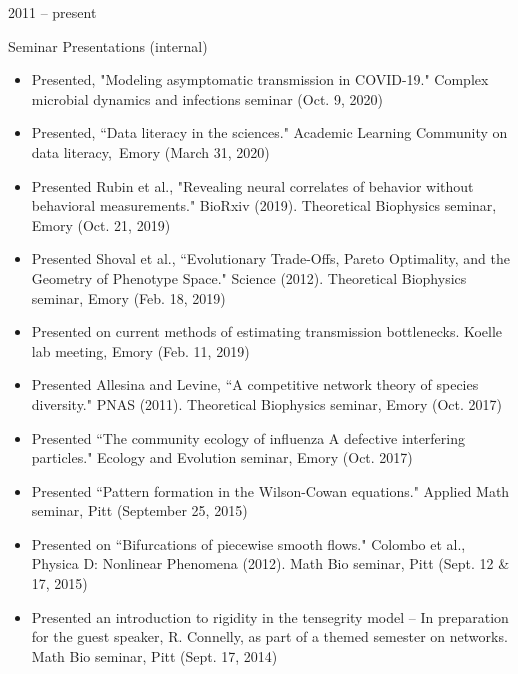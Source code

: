 \documentclass[a4paper,10pt]{article}
\newlength{\cvcolumngapwidth}
\newlength{\cvleftcolumnwidth}
\newlength{\cvrightcolumnwidth}
\newcommand{\cvtitlestyle}[1]{{\large\cvtitlefont\textcolor{cvtitlecolor}{#1}}}
\newcommand{\cvdurationstyle}[1]{{\small\cvdurationfont\textcolor{cvdurationcolor}{#1}}}
\newlength{\cvafteritemskipamount}
\newlength{\cvaftertitleskipamount}
\newlength{\cvparskip}
\newcommand{\cvitem}[2]{
    \begin{minipage}[t]{\cvleftcolumnwidth}
        \raggedleft #1
    \end{minipage}%
    \hspace{\cvcolumngapwidth}%
    \begin{minipage}[t]{\cvrightcolumnwidth}
        \setlength{\parskip}{\cvparskip} #2
    \end{minipage}

    \vspace{\cvafteritemskipamount}
}
\newcommand{\cvtitle}[1]{
    \cvtitlestyle{#1}

    \vspace{\cvaftertitleskipamount}
    \vspace{-\cvparskip}
}
\begin{document}
\cvitem{
    \cvdurationstyle{2011 -- present}
}{
    \cvtitle{Seminar Presentations (internal)}
    \begin{itemize}[leftmargin=*]
	\item Presented, "Modeling asymptomatic transmission in COVID-19." Complex microbial dynamics and infections seminar (Oct. 9, 2020) \\
    	\item Presented, ``Data literacy in the sciences."  Academic Learning Community on data literacy,\, Emory (March 31, 2020)\\
    	\item Presented Rubin et al., "Revealing neural correlates of behavior without behavioral measurements." BioRxiv (2019). Theoretical Biophysics seminar, Emory (Oct. 21, 2019) \\
        \item Presented Shoval et al., ``Evolutionary Trade-Offs, Pareto Optimality, and the Geometry of Phenotype Space." Science (2012). Theoretical Biophysics seminar, Emory (Feb. 18, 2019) \\
        \item Presented on current methods of estimating transmission bottlenecks. Koelle lab meeting, Emory (Feb. 11, 2019) \\
        \item Presented Allesina and Levine, ``A competitive network theory of species diversity." PNAS (2011). Theoretical Biophysics seminar, Emory (Oct. 2017) \\
        \item Presented  ``The community ecology of influenza A defective interfering particles." Ecology and Evolution seminar, Emory (Oct. 2017) \\
    \end{itemize}
    \begin{itemize}[leftmargin=*]
        \item Presented ``Pattern formation in the Wilson-Cowan equations." Applied Math seminar, Pitt (September 25, 2015) \\
        \item Presented on ``Bifurcations of piecewise smooth flows." Colombo et al., Physica D: Nonlinear Phenomena (2012). Math Bio seminar, Pitt (Sept. 12 \& 17, 2015) \\
        \item Presented an introduction to rigidity in the tensegrity model -- In preparation for the guest speaker, R. Connelly, as part of a themed semester on networks. Math Bio seminar, Pitt (Sept. 17, 2014) \\

\end{itemize}}
\end{document}
